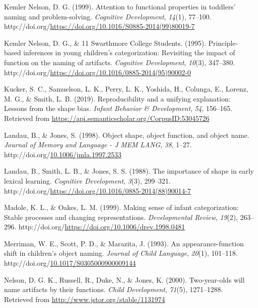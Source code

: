 \documentclass[10pt, letterpaper]{article}
\newenvironment{CSLReferences}%
  {}%
  {\par}
\begin{document}
\begin{CSLReferences}{1}{0}
\leavevmode{}%
Kemler Nelson, D. G. (1999). Attention to functional properties in
toddlers' naming and problem-solving. \emph{Cognitive Development},
\emph{14}(1), 77--100.
http://doi.org/\url{https://doi.org/10.1016/S0885-2014(99)80019-7}

\leavevmode{}%
Kemler Nelson, D. G., \& 11 Swarthmore College Students. (1995).
Principle-based inferences in young children's categorization:
Revisiting the impact of function on the naming of artifacts.
\emph{Cognitive Development}, \emph{10}(3), 347--380.
http://doi.org/\url{https://doi.org/10.1016/0885-2014(95)90002-0}

\leavevmode{}%
Kucker, S. C., Samuelson, L. K., Perry, L. K., Yoshida, H., Colunga, E.,
Lorenz, M. G., \& Smith, L. B. (2019). Reproducibility and a unifying
explanation: Lessons from the shape bias. \emph{Infant Behavior \&
Development}, \emph{54}, 156--165. Retrieved from
\url{https://api.semanticscholar.org/CorpusID:53045726}

\leavevmode{}%
Landau, B., \& Jones, S. (1998). Object shape, object function, and
object name. \emph{Journal of Memory and Language - J MEM LANG},
\emph{38}, 1--27.
http://doi.org/\href{https://doi.org/10.1006/jmla.1997.2533}{10.1006/jmla.1997.2533}

\leavevmode{}%
Landau, B., Smith, L. B., \& Jones, S. S. (1988). The importance of
shape in early lexical learning. \emph{Cognitive Development},
\emph{3}(3), 299--321.
http://doi.org/\url{https://doi.org/10.1016/0885-2014(88)90014-7}

\leavevmode{}%
Madole, K. L., \& Oakes, L. M. (1999). Making sense of infant
categorization: Stable processes and changing representations.
\emph{Developmental Review}, \emph{19}(2), 263--296.
http://doi.org/\url{https://doi.org/10.1006/drev.1998.0481}

\leavevmode{}%
Merriman, W. E., Scott, P. D., \& Marazita, J. (1993). An
appearance-function shift in children's object naming. \emph{Journal of
Child Language}, \emph{20}(1), 101--118.
http://doi.org/\href{https://doi.org/10.1017/S0305000900009144}{10.1017/S0305000900009144}

\leavevmode{}%
Nelson, D. G. K., Russell, R., Duke, N., \& Jones, K. (2000).
Two-year-olds will name artifacts by their functions. \emph{Child
Development}, \emph{71}(5), 1271--1288. Retrieved from
\url{http://www.jstor.org/stable/1131974}


\end{CSLReferences}
\end{document}
